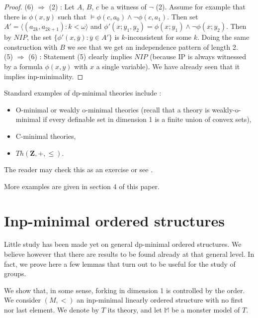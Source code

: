 \documentclass[english]{article}
\theoremstyle{definition}
\theoremstyle{mystyle}
\theoremstyle{remark}
\newcommand{\MM}{\mathbb M}
\begin{document}
\begin{proof}
(6) $\Rightarrow$ (2) : Let $A$, $B$, $c$ be a witness of $\neg$ (2). Assume for example that there is $\phi(x,y)$ such that $\models \phi(c,a_0) \wedge \neg\phi(c,a_1)$. Then set $A' = \langle (a_{2k},a_{2k+1}) : k<\omega \rangle$ and $\phi'(x;y_1,y_2) = \phi(x;y_1) \wedge \neg\phi(x;y_2)$. Then by $NIP$, the set $\{\phi'(x,\bar y) : \bar y \in A'\}$ is $k$-inconsistent for some $k$. Doing the same construction with $B$ we see that we get an independence pattern of length 2.
\\

(5) $\Rightarrow$ (6) : Statement (5) clearly implies $NIP$ (because IP is always witnessed by a formula $\phi(x,y)$ with $x$ a single variable). We have already seen that it implies inp-minimality.
\end{proof}

Standard examples of dp-minimal theories include :
\begin{itemize}
\item O-minimal or weakly o-minimal theories (recall that a theory is weakly-o-minimal if every definable set in dimension 1 is a finite union of convex sets),
\item C-minimal theories,
\item $Th(\mathbf Z,+,\leq)$.
\end{itemize}
The reader may check this as an exercise or see \cite{Good}.

More examples are given in section 4 of this paper.

\section{Inp-minimal ordered structures}

Little study has been made yet on general dp-minimal ordered structures. We believe however that there are results to be found already at that general level. In fact, we prove here a few lemmas that turn out to be useful for the study of groups.

We show that, in some sense, forking in dimension 1 is controlled by the order.
\\

We consider $(M,<)$ an inp-minimal linearly ordered structure with no first nor last element. We denote by $T$ its theory, and let $\MM$ be a monster model of $T$.
\end{document}
